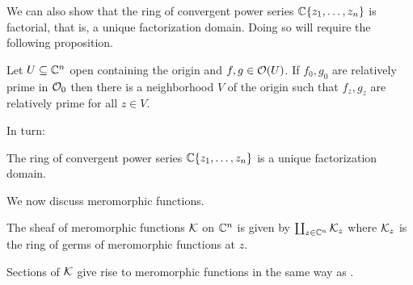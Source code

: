 We can also show that the ring of convergent power series $\mathbb{C}\{z_{1},\dots,z_{n}\}$ is factorial, that is, a unique factorization domain. Doing so will require the following proposition. 
\begin{proposition}\label{prop: relatively prime germs}
    Let $U\subseteq\mathbb{C}^{n}$ open containing the origin and $f,g\in\mathcal{O}(U)$. If $f_{0},g_{0}$ are relatively prime in $\mathcal{O}_{0}$ then there is a neighborhood $V$ of the origin such that $f_{z},g_{z}$ are relatively prime for all $z\in V$. 
\end{proposition}
In turn:
\begin{theorem}\label{thm: convergent power series is UFD}
    The ring of convergent power series $\mathbb{C}\{z_{1},\dots,z_{n}\}$ is a unique factorization domain. 
\end{theorem}
We now discuss meromorphic functions. 
\begin{definition}\label{def: sheaf of meromorphic functions}
    The sheaf of meromorphic functions $\mathcal{K}$ on $\mathbb{C}^{n}$ is given by $\coprod_{z\in\mathbb{C}^{n}}\mathcal{K}_{z}$ where $\mathcal{K}_{z}$ is the ring of germs of meromorphic functions at $z$. 
\end{definition}
Sections of $\mathcal{K}$ give rise to meromorphic functions in the same way as . 